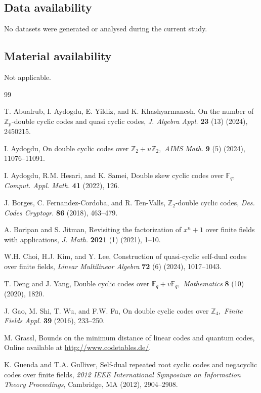 \documentclass[12pt]{article}
\begin{document}
	\subsection*{Data availability}
	No datasets were generated or analysed during the current study.
	
	\subsection*{Material availability}
	Not applicable.
	
	\begin{thebibliography}{99}
		
		 T. Abualrub, I. Aydogdu, E. Yildiz, and K. Khashyarmanesh, On the number of $\mathbb{Z}_p$-double cyclic codes and quasi cyclic codes, {\it J. Algebra Appl.} {\bf 23} (13) (2024), 2450215.
		
		 I. Aydogdu, On double cyclic codes over $\mathbb{Z}_2+u\mathbb{Z}_2,$ {\it AIMS Math.} {\bf 9} (5) (2024), 11076--11091.
		
		 I. Aydogdu, R.M. Hesari, and K. Samei, Double skew cyclic codes over $\mathbb{F}_q,$ {\it Comput. Appl. Math.} {\bf 41} (2022), 126.
		
		 J. Borges, C. Fernandez-Cordoba, and R. Ten-Valls, $\mathbb{Z}_2$-double cyclic codes, {\it Des. Codes Cryptogr.} {\bf 86} (2018), 463--479.
		
		 A. Boripan and S. Jitman, Revisiting the factorization of $x^n+1$ over finite fields with applications, {\it J. Math.} {\bf 2021} (1) (2021), 1--10.
		
		 W.H. Choi, H.J. Kim, and Y. Lee, Construction of quasi-cyclic self-dual codes over finite fields, {\it Linear Multilinear Algebra} {\bf 72} (6) (2024), 1017--1043.
		
		 T. Deng and J. Yang, Double cyclic codes over $\mathbb{F}_q+v\mathbb{F}_q,$ {\it Mathematics} {\bf 8} (10) (2020), 1820.
		
		 J. Gao, M. Shi, T. Wu, and F.W. Fu, On double cyclic codes over $\mathbb{Z}_4,$ {\it Finite Fields Appl.} {\bf 39} (2016), 233--250.
		
		 M. Grassl, Bounds on the minimum distance of linear codes and quantum codes, Online available at \url{http://www.codetables.de/}.
		
		 K. Guenda and T.A. Gulliver, Self-dual repeated root cyclic codes and negacyclic codes over finite fields, {\it 2012 IEEE International Symposium on Information Theory Proceedings}, Cambridge, MA (2012), 2904--2908.
		

\end{thebibliography}
\end{document}
